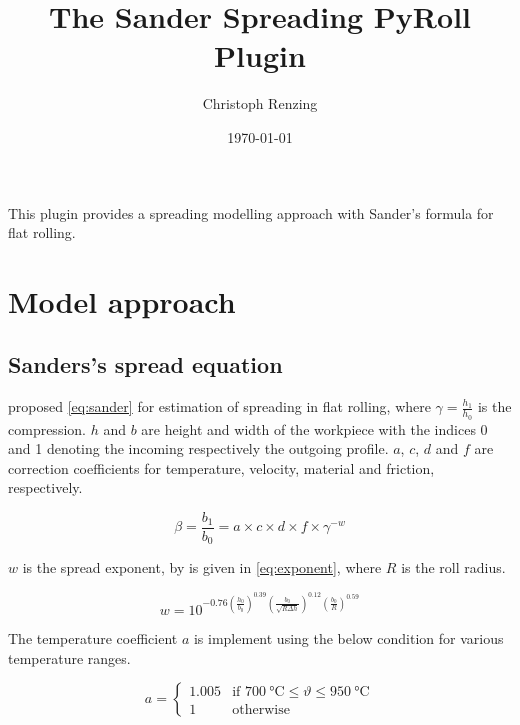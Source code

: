 \documentclass[11pt]{PyRollDocs}
\begin{document}
    \title{The Sander Spreading PyRoll Plugin}
    \author{Christoph Renzing}
    \date{\today}

    \maketitle

    This plugin provides a spreading modelling approach with Sander's formula for flat rolling.


    \section{Model approach}\label{sec:model-approach}

    \subsection{Sanders's spread equation}\label{subsec:sander's-spread-equation}

    \textcite{Sander1976, Sander1978} proposed \autoref{eq:sander} for estimation of spreading in flat rolling,
    where $\gamma = \frac{h_1}{h_0}$ is the compression. $h$ and $b$ are height and width of the workpiece with the indices
    0 and 1 denoting the incoming respectively the outgoing profile. $a$, $c$, $d$ and $f$ are correction
    coefficients for temperature, velocity, material and friction, respectively.

    \begin{equation}
        \beta = \frac{b_1}{b_0} = a \times c \times d \times f \times \gamma^{-w}
        \label{eq:sander}
    \end{equation}

    $w$ is the spread exponent, by \textcite{Sander1976} is given in \autoref{eq:exponent}, where $R$ is the roll radius.

    \begin{equation}
        w = 10^{ -0.76 \left( \frac{h_0}{b_0} \right)^{0.39} \left(\frac{b_0}{\sqrt{R \Delta h}} \right)^{0.12} \left( \frac{b_0}{R} \right)^{0.59} }
        \label{eq:exponent}
    \end{equation}

    \noindent The temperature coefficient $a$ is implement using the below condition for various temperature ranges.

    \begin{equation}
        a =
        \begin{cases}
            1.005          & \text{if }  \qty{700}{\celsius} \leq \vartheta \leq \qty{950}{\celsius}\\
            1              & \text{otherwise}
        \end{cases}
        \label{eq:temperature-coefficient}
    \end{equation}
\end{document}
